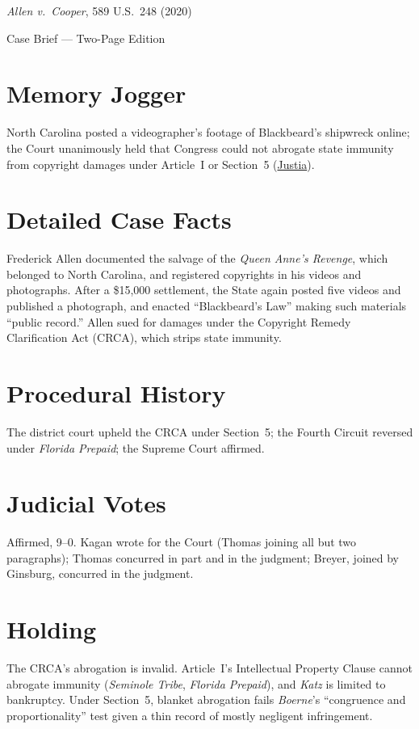 \documentclass[12pt]{article}
\begin{document}
\begin{center}
{\LARGE \textit{Allen v.\ Cooper}, 589 U.S.\ 248 (2020)\par}
\vspace{0.5em}
{\large Case Brief --- Two-Page Edition\par}
\end{center}

\section{Memory Jogger}
North Carolina posted a videographer's footage of Blackbeard's shipwreck online; the Court unanimously held that Congress could not abrogate state immunity from copyright damages under Article~I or Section~5 (\href{https://supreme.justia.com/cases/federal/us/589/18-877/}{Justia}).

\section{Detailed Case Facts}
Frederick Allen documented the salvage of the \textit{Queen Anne's Revenge}, which belonged to North Carolina, and registered copyrights in his videos and photographs. After a \$15,000 settlement, the State again posted five videos and published a photograph, and enacted ``Blackbeard's Law'' making such materials ``public record.'' Allen sued for damages under the Copyright Remedy Clarification Act (CRCA), which strips state immunity.

\section{Procedural History}
The district court upheld the CRCA under Section~5; the Fourth Circuit reversed under \textit{Florida Prepaid}; the Supreme Court affirmed.

\section{Judicial Votes}
Affirmed, 9--0. Kagan wrote for the Court (Thomas joining all but two paragraphs); Thomas concurred in part and in the judgment; Breyer, joined by Ginsburg, concurred in the judgment.

\section{Holding}
The CRCA's abrogation is invalid. Article~I's Intellectual Property Clause cannot abrogate immunity (\textit{Seminole Tribe}, \textit{Florida Prepaid}), and \textit{Katz} is limited to bankruptcy. Under Section~5, blanket abrogation fails \textit{Boerne}'s ``congruence and proportionality'' test given a thin record of mostly negligent infringement.
\end{document}

